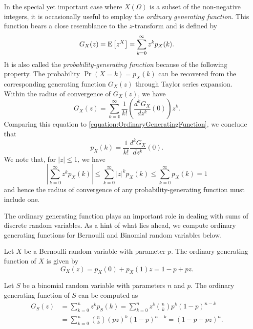 In the special yet important case where $X(\Omega)$ is a subset of the non-negative integers, it is occasionally useful to employ the \emph{ordinary generating function}. 
This function bears a close resemblance to the $z$-transform and is defined by
\begin{equation} \label{equation:OrdinaryGeneratingFunction}
G_X(z) = \mathrm{E} \left[ z^X \right] = \sum_{k=0}^{\infty} z^k p_X (k) .
\end{equation}
It is also called the \emph{probability-generating function} because of the following property. 
The probability $\Pr (X = k) = p_X(k)$ can be recovered from the corresponding generating function $G_X (z)$ through Taylor series expansion.
Within the radius of convergence of $G_X(z)$, we have
\begin{equation*}
G_X(z) = \sum_{k=0}^{\infty} \frac{1}{k!} \left( \frac{d^k G_X}{dz^k}(0) \right) z^k .
\end{equation*}
Comparing this equation to \eqref{equation:OrdinaryGeneratingFunction}, we conclude that
\begin{equation*}
p_X(k) = \frac{1}{k!} \frac{d^k G_X}{dz^k} (0) .
\end{equation*}
We note that, for $|z| \leq 1$, we have
\begin{equation*}
\left| \sum_{k=0}^{\infty} z^k p_X(k) \right|
\leq \sum_{k=0}^{\infty} |z|^k p_X(k)
\leq \sum_{k=0}^{\infty} p_X(k) = 1
\end{equation*}
and hence the radius of convergence of any probability-generating function must include one.

The ordinary generating function plays an important role in dealing with sums of discrete random variables.
As a hint of what lies ahead, we compute ordinary generating functions for Bernoulli and Binomial random variables below.

\begin{example}
Let $X$ be a Bernoulli random variable with parameter $p$.
The ordinary generating function of $X$ is given by
\begin{equation*}
G_X(z) = p_X(0) + p_X(1) z
= 1 - p + pz .
\end{equation*}
\end{example}

\begin{example}
Let $S$ be a binomial random variable with parameters $n$ and $p$.
The ordinary generating function of $S$ can be computed as
\begin{equation*}
\begin{split}
G_S(z) &= \sum_{k=0}^{n} z^k p_S (k)
= \sum_{k=0}^{n} z^k \binom{n}{k} p^k (1 - p)^{n-k} \\
&= \sum_{k=0}^{n} \binom{n}{k} (pz)^k (1 - p)^{n-k}
= (1 - p + pz)^n .
\end{split}
\end{equation*}
\end{example}

